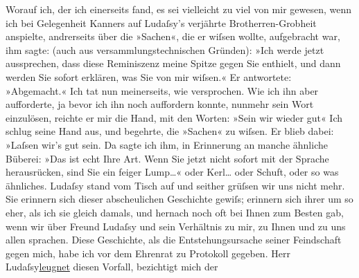 \begin{ledgroupsized}[t]{13cm}
               Worauf ich, der ich einerseits fand, es sei vielleicht zu viel von mir gewesen, wenn
               ich bei Gelegenheit Kanners auf Ludaſsy’s verjährte Brotherren-Grobheit
               anspielte, andrerseits über die »Sachen«, die er wiſsen wollte, aufgebracht war, ihm
               sagte: (auch aus versammlungstechnischen Gründen): »Ich werde jetzt aussprechen, dass
               diese Reminiszenz meine Spitze gegen Sie enthielt, und dann werden Sie sofort
               erklären, was Sie von mir wiſsen.« Er antwortete: »Abgemacht.« Ich tat nun
               meinerseits, wie versprochen. Wie ich ihn aber aufforderte, ja bevor ich ihn noch
               auffordern konnte, nunmehr sein Wort einzulösen, reichte er mir die Hand, mit den
               Worten: »Sein wir wieder gut{\dotstwo}« Ich schlug seine Hand aus,
               und begehrte, die »Sachen« zu wiſsen. Er blieb dabei: »Laſsen wir’s gut sein. Da
               sagte ich ihm, in Erinnerung an manche ähnliche Büberei: »Das ist echt Ihre Art. Wenn
               Sie jetzt nicht sofort mit {\pb}der
               Sprache herausrücken, sind Sie ein feiger Lump{\dots}« oder
                  Kerl{\dots} oder Schuft, oder so was ähnliches. Ludaſsy stand vom Tisch auf und seither grüſsen
               wir uns nicht mehr. \pend
           \pstart
           Sie erinnern sich dieser abscheulichen Geschichte gewiſs; erinnern sich ihrer um so
               eher, als ich sie gleich damals, und hernach noch oft bei Ihnen zum Besten gab, wenn
               wir über Freund Ludaſsy und sein Verhältnis zu
               mir, zu Ihnen und zu uns allen sprachen. \pend
           \pstart
           Diese Geschichte, als die Entstehungsursache seiner Feindschaft gegen mich, habe ich
               vor dem Ehrenrat zu Protokoll gegeben. Herr Ludaſsy\uline{leugnet} diesen Vorfall, bezichtigt mich der

\end{ledgroupsized}
